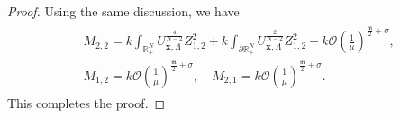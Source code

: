 \documentclass[10pt,a4paper]{amsart}
\begin{document}
\begin{proof}
Using the same discussion, we have
\begin{align*}
  \begin{aligned}
    &M_{2,2}= k \int_{\mathbb{R}_{+}^{N}} U_{\mathbf{x},\Lambda}^{\frac{4}{N-2}} Z_{1,2}^2 + k \int_{\partial\mathbb{R}_{+}^{N}} U_{\mathbf{x},\Lambda}^{\frac{2}{N-2}} Z_{1,2}^2 + k\mathcal O\left(\frac{1}{\mu}\right)^{\frac{\mathfrak m}{2}+\sigma},\\
    &M_{1,2} = k\mathcal O\left(\frac{1}{\mu}\right)^{\frac{\mathfrak m}{2}+\sigma}, \quad  M_{2,1} = k\mathcal O\left(\frac{1}{\mu}\right)^{\frac{\mathfrak m}{2}+\sigma}.
  \end{aligned}
\end{align*}
This completes the proof.%
\end{proof}
\end{document}
